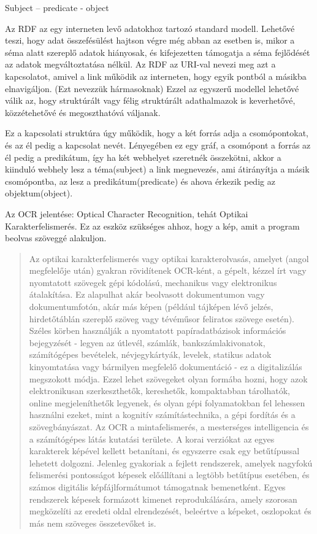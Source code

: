 

Subject – predicate  - object

Az RDF az egy interneten levő adatokhoz tartozó standard modell. Lehetővé teszi, hogy adat összefésülést hajtson végre még abban az esetben is, mikor a séma alatt szereplő adatok hiányosak, és kifejezetten támogatja a séma fejlődését az adatok megváltoztatása nélkül.
Az RDF az URI-val nevezi meg azt a kapcsolatot, amivel a link működik az interneten, hogy egyik pontból a másikba elnavigáljon. (Ezt nevezzük hármasoknak) Ezzel az egyszerű modellel lehetővé válik az, hogy struktúrált vagy félig struktúrált adathalmazok is keverhetővé, közzétehetővé és megoszthatóvá váljanak.

Ez a kapcsolati struktúra úgy működik, hogy a két forrás adja a csomópontokat, és az él pedig a kapcsolat nevét. Lényegében ez egy gráf, a csomópont a forrás az él pedig a predikátum, így ha két webhelyet szeretnék összekötni, akkor a kiinduló webhely lesz a téma(subject) a link megnevezés, ami átirányítja a másik csomópontba, az lesz a predikátum(predicate) és ahova érkezik pedig az objektum(object).



Az OCR jelentése: Optical Character Recognition, tehát Optikai Karakterfelismerés. Ez az eszköz szükséges ahhoz, hogy a kép, amit a program beolvas szöveggé alakuljon.

\begin{quotation}
	Az optikai karakterfelismerés vagy optikai karakterolvasás, amelyet (angol megfelelője után) gyakran rövidítenek OCR-ként, a gépelt, kézzel írt vagy nyomtatott szövegek gépi kódolású, mechanikus vagy elektronikus átalakítása. Ez alapulhat akár beolvasott dokumentumon vagy dokumentumfotón, akár más képen (például tájképen lévő jelzés, hirdetőtáblán szereplő szöveg vagy tévéműsor feliratos szövege esetén). Széles körben használják a nyomtatott papíradatbázisok információs bejegyzését - legyen az útlevél, számlák, bankszámlakivonatok, számítógépes bevételek, névjegykártyák, levelek, statikus adatok kinyomtatása vagy bármilyen megfelelő dokumentáció - ez a digitalizálás megszokott módja. Ezzel lehet szövegeket olyan formába hozni, hogy azok elektronikusan szerkeszthetők, kereshetők, kompaktabban tárolhatók, online megjeleníthetők legyenek, és olyan gépi folyamatokban fel lehessen használni ezeket, mint a kognitív számítástechnika, a gépi fordítás és a szövegbányászat. Az OCR a mintafelismerés, a mesterséges intelligencia és a számítógépes látás kutatási területe. A korai verziókat az egyes karakterek képével kellett betanítani, és egyszerre csak egy betűtípussal lehetett dolgozni. Jelenleg gyakoriak a fejlett rendszerek, amelyek nagyfokú felismerési pontosságot képesek előállítani a legtöbb betűtípus esetében, és számos digitális képfájlformátumot támogatnak bemenetként. Egyes rendszerek képesek formázott kimenet reprodukálására, amely szorosan megközelíti az eredeti oldal elrendezését, beleértve a képeket, oszlopokat és más nem szöveges összetevőket is.
\end{quotation}

